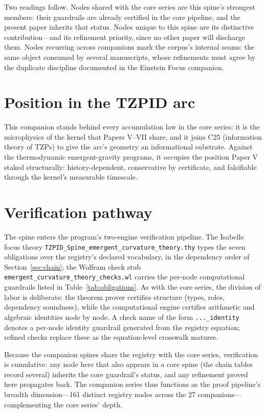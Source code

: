 \documentclass[11pt]{article}
\theoremstyle{remark}
\begin{document}
Two readings follow. Nodes shared with the core series are this spine's strongest members: their guardrails are already certified in the core pipeline, and the present paper inherits that status. Nodes unique to this spine are its distinctive contribution---and its refinement priority, since no other paper will discharge them. Nodes recurring across companions mark the corpus's internal seams: the same object consumed by several manuscripts, whose refinements must agree by the duplicate discipline documented in the Einstein Focus companion.

\section{Position in the TZPID arc}
\label{sec:arc}

This companion stands behind every accumulation law in the core series: it is the microphysics of the kernel that Papers V--VII share, and it joins C25 (information theory of TZPs) to give the arc's geometry an informational substrate. Against the thermodynamic emergent-gravity programs, it occupies the position Paper V staked structurally: history-dependent, conservative by certificate, and falsifiable through the kernel's measurable timescale.

\section{Verification pathway}
\label{sec:verify}

The spine enters the program's two-engine verification pipeline. The Isabelle focus theory \texttt{TZPID\_Spine\_emergent\_curvature\_theory.thy} types the seven obligations over the registry's declared vocabulary, in the dependency order of Section~\ref{sec:chain}; the Wolfram check stub \texttt{emergent\_curvature\_theory\_checks.wl} carries the per-node computational guardrails listed in Table~\ref{tab:obligations}. As with the core series, the division of labor is deliberate: the theorem prover certifies structure (types, roles, dependency soundness), while the computational engine certifies arithmetic and algebraic identities node by node. A check name of the form \texttt{...\_identity} denotes a per-node identity guardrail generated from the registry equation; refined checks replace these as the equation-level crosswalk matures.

Because the companion spines share the registry with the core series, verification is cumulative: any node here that also appears in a core spine (the chain tables record several) inherits the core guardrail's status, and any refinement proved here propagates back. The companion series thus functions as the proof pipeline's breadth dimension---161 distinct registry nodes across the 27 companions---complementing the core series' depth.
\end{document}
